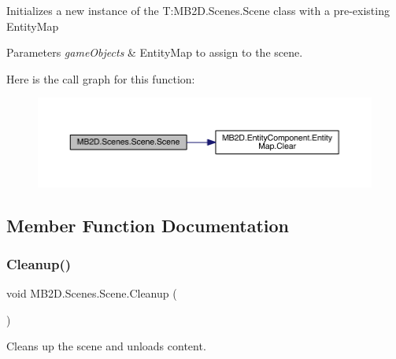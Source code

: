 Initializes a new instance of the T\+:\+M\+B2\+D.\+Scenes.\+Scene class with a pre-\/existing Entity\+Map 


\begin{DoxyParams}{Parameters}
{\em game\+Objects} & Entity\+Map to assign to the scene.\\
\hline
\end{DoxyParams}
Here is the call graph for this function\+:
\nopagebreak
\begin{figure}[H]
\begin{center}
\leavevmode
\includegraphics[width=350pt]{class_m_b2_d_1_1_scenes_1_1_scene_ac9cb0c45a98614e7e4c1307ebb6ef85e_cgraph}
\end{center}
\end{figure}


\subsection{Member Function Documentation}
\hypertarget{class_m_b2_d_1_1_scenes_1_1_scene_a3ee3777b94ccff0a739e75ca1ca151c6}{}\label{class_m_b2_d_1_1_scenes_1_1_scene_a3ee3777b94ccff0a739e75ca1ca151c6} 
\subsubsection{\texorpdfstring{Cleanup()}{Cleanup()}}
{\footnotesize\ttfamily void M\+B2\+D.\+Scenes.\+Scene.\+Cleanup (\begin{DoxyParamCaption}{ }\end{DoxyParamCaption})\hspace{0.3cm}{\ttfamily [inline]}}



Cleans up the scene and unloads content. 

